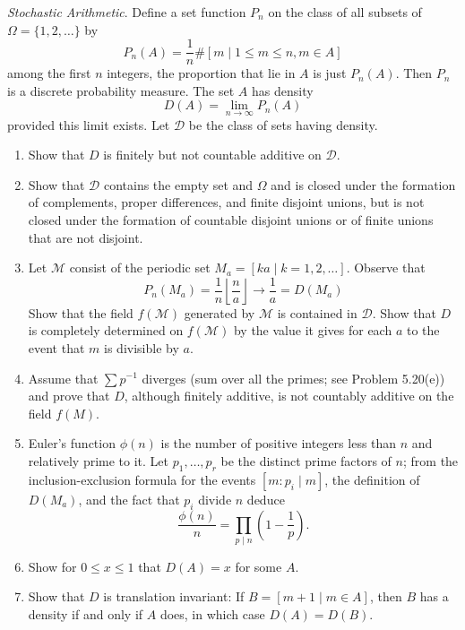 \documentclass[11pt]{article}
\newcommand\floor[1]{\left \lfloor #1 \right \rfloor}
\newcommand{\Om}{\Omega}
\newcommand{\mc}{\mathcal}
\newenvironment{exercise}[2][Exercise]{\begin{trivlist}
\item[\hskip \labelsep {\bfseries #1}\hskip \labelsep {\bfseries #2.}]}{\end{trivlist}}
\begin{document}
\begin{exercise}{2.18}
    \emph{Stochastic Arithmetic}. Define a set function $P_n$ on the class of all subsets of $\Om = \{ 1, 2, \ldots \}$ by
    \[ P_n (A) = \frac{1}{n} \#[m \mid 1 \leq m \leq n, m \in A] \]
    among the first $n$ integers, the proportion that lie in $A$ is just $P_n (A)$. Then $P_n$ is a discrete probability measure. The set $A$ has density
    \[ D(A) = \lim_{n \to \infty} P_n (A) \]
    provided this limit exists. Let $\mc{D}$ be the class of sets having density.
    \begin{enumerate}
        \item Show that $D$ is finitely but not countable additive on $\mc{D}$.
        \item Show that $\mc{D}$ contains the empty set and $\Om$ and is closed under the formation of complements, proper differences, and finite disjoint unions, but is not closed under the formation of countable disjoint unions or of finite unions that are not disjoint.
        \item Let $\mc{M}$ consist of the periodic set $M_a = [ ka \mid k = 1, 2, \ldots ]$. Observe that
        \[ P_n (M_a) = \frac{1}{n} \floor{\frac{n}{a}} \to \frac{1}{a} = D(M_a) \]
        Show that the field $f(\mc M)$ generated by $\mc M$ is contained in $\mc D$. Show that $D$ is completely determined on $f(\mc M)$ by the value it gives for each $a$ to the event that $m$ is divisible by $a$.
        \item Assume that $\sum p^{-1}$ diverges (sum over all the primes; see Problem 5.20(e)) and prove that $D$, although finitely additive, is not countably additive on the field $f(M)$.
        \item Euler's function $\phi(n)$ is the number of positive integers less than $n$ and relatively prime to it. Let $p_1, \ldots, p_r$ be the distinct prime factors of $n$; from the inclusion-exclusion formula for the events $[m: p_i \mid m]$, the definition of $D(M_a)$, and the fact that $p_i$ divide $n$ deduce
        \[ \frac{\phi(n)}{n} = \prod_{p \mid n} \left ( 1 - \frac{1}{p} \right). \]
        \item Show for $0 \leq x \leq 1$ that $D(A) = x$ for some $A$.
        \item Show that $D$ is translation invariant: If $B = [ m + 1 \mid m \in A ]$, then $B$ has a density if and only if $A$ does, in which case $D(A) = D(B)$.
        \end{enumerate}
\end{exercise}
\end{document}

